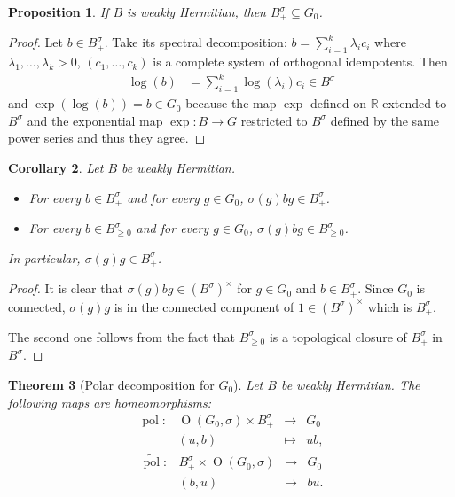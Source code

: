 \documentclass[a4paper,oneside,11pt]{amsart}
\DeclareMathOperator{\OO}{O}
\DeclareMathOperator{\pol}{pol}
\newcommand{\R}{\mathbb R}
\theoremstyle{plain}
\newtheorem{teo}{Theorem}[section]
\newtheorem{cor}[teo]{Corollary}
\newtheorem{prop}[teo]{Proposition}
\theoremstyle{definition}
\theoremstyle{remark}
\begin{document}
\begin{prop}\label{prop:PositiveElts}
If $B$ is weakly Hermitian, then $B^{\sigma}_+\subseteq G_0$.
\end{prop}

\begin{proof}
Let $b\in B^{\sigma}_+$. Take its spectral decomposition: $b=\sum_{i=1}^k\lambda_ic_i$ where $\lambda_1,\dots,\lambda_k>0$, $(c_1,\dots,c_k)$ is a complete system of orthogonal idempotents. Then 
\begin{align*}
\log(b)&=\sum_{i=1}^k\log(\lambda_i)c_i\in B^{\sigma}
\end{align*}
and $\exp(\log(b))=b\in G_0$ because the map $\exp$ defined on $\R$ extended to $B^{\sigma}$ and the exponential map $\exp\colon B\to G$ restricted to $B^{\sigma}$ defined by the same power series and thus they agree.
\end{proof}

\begin{cor} Let $B$ be weakly Hermitian.
\begin{itemize}
\item For every $b\in B^{\sigma}_+$ and for every $g\in G_0$, $\sigma(g)bg\in B^{\sigma}_+$.
\item For every $b\in B^{\sigma}_{\geq 0}$ and for every $g\in G_0$,
$\sigma(g)bg\in B^{\sigma}_{\geq 0}$.
\end{itemize}
In particular, $\sigma(g)g\in B^{\sigma}_+$.
\end{cor}

\begin{proof} It is clear that $\sigma(g)bg\in (B^{\sigma})^\times$ for $g\in G_0$ and $b\in B^{\sigma}_+$. Since $G_0$ is connected, $\sigma(g)g$ is in the connected component of $1\in (B^{\sigma})^\times$ which is $B^{\sigma}_+$.

\noindent The second one follows from the fact that $B^{\sigma}_{\geq 0}$ is a topological closure of $B^{\sigma}_+$ in $B^{\sigma}$.
\end{proof}

\begin{teo}[Polar decomposition for $G_0$]\label{pol_decomp0}
Let $B$ be weakly Hermitian. The following maps are homeomorphisms:
$$\begin{matrix}
\pol\colon & \OO(G_0,\sigma)\times B^{\sigma}_+ & \to & G_0 \\
& (u,b) & \mapsto & ub,
\end{matrix}$$
$$\begin{matrix}
\widetilde{\pol}\colon& B^{\sigma}_+ \times \OO(G_0,\sigma) & \to & G_0 \\
&(b,u) & \mapsto & bu.
\end{matrix}$$
\end{teo}
\end{document}
